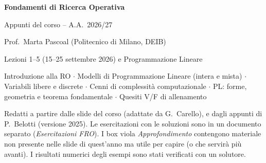 \documentclass[11pt,a4paper,openany]{report}
\begin{document}
\begin{titlepage}
\centering
\vspace*{3cm}
{\Huge\bfseries Fondamenti di Ricerca Operativa\par}
\vspace{0.6cm}
{\Large Appunti del corso -- A.A.\ 2026/27\par}
\vspace{0.4cm}
{\large Prof.\ Marta Pascoal (Politecnico di Milano, DEIB)\par}
\vspace{1.5cm}
{\large Lezioni 1--5 (15--25 settembre 2026) e Programmazione Lineare\par}
\vspace{0.3cm}
\begin{minipage}{0.75\textwidth}\centering
Introduzione alla RO $\cdot$ Modelli di Programmazione Lineare (intera e mista) $\cdot$ Variabili libere e discrete $\cdot$ Cenni di complessità computazionale $\cdot$ PL: forme, geometria e teorema fondamentale $\cdot$ Quesiti V/F di allenamento
\end{minipage}
\vfill
{\small Redatti a partire dalle slide del corso (adattate da G.\ Carello), e dagli appunti di P.\ Belotti (versione 2025). Le esercitazioni con le soluzioni sono in un documento separato (\emph{Esercitazioni FRO}). I box viola \emph{Approfondimento} contengono materiale non presente nelle slide di quest'anno ma utile per capire (o che servirà più avanti). I risultati numerici degli esempi sono stati verificati con un solutore.\par}
\end{titlepage}

\tableofcontents








\end{document}
